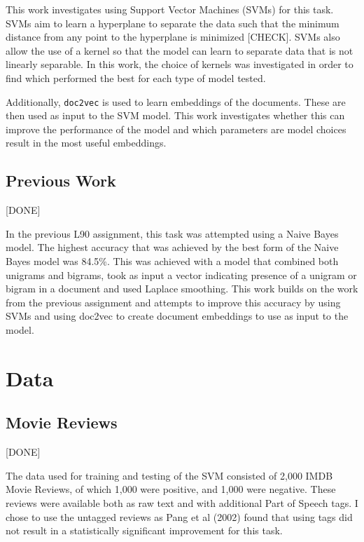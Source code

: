 \documentclass[twocolumn]{article}
\begin{document}
This work investigates using Support Vector Machines (SVMs) for this task. SVMs aim to learn a hyperplane to separate the data such that the minimum distance from any point to the hyperplane is minimized [CHECK]. SVMs also allow the use of a kernel so that the model can learn to separate data that is not linearly separable. In this work, the choice of kernels was investigated in order to find which performed the best for each type of model tested.

Additionally, \texttt{doc2vec} is used to learn embeddings of the documents. These are then used as input to the SVM model. This work investigates whether this can improve the performance of the model and which parameters are model choices result in the most useful embeddings.

\subsection{Previous Work}

[DONE]

In the previous L90 assignment, this task was attempted using a Naive Bayes model. The highest accuracy that was achieved by the best form of the Naive Bayes model was 84.5\%. This was achieved with a model that combined both unigrams and bigrams, took as input a vector indicating presence of a unigram or bigram in a document and used Laplace smoothing. This work builds on the work from the previous assignment and attempts to improve this accuracy by using SVMs and using doc2vec to create document embeddings to use as input to the model.

\section{Data}


\subsection{Movie Reviews}

[DONE]

The data used for training and testing of the SVM consisted of 2,000 IMDB Movie Reviews, of which 1,000 were positive, and 1,000 were negative. These reviews were available both as raw text and with additional Part of Speech tags. I chose to use the untagged reviews as Pang et al (2002) \cite{pang} found that using tags did not result in a statistically significant improvement for this task. 
\end{document}
